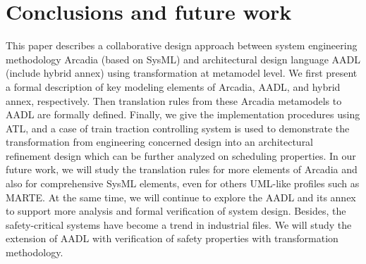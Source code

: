 \section{Conclusions and future work}
This paper describes a collaborative design approach between system engineering methodology Arcadia (based on SysML) and architectural design language AADL (include hybrid annex) using transformation at metamodel level. We first present a formal description of key modeling elements of Arcadia, AADL, and hybrid annex, respectively. Then translation rules from these Arcadia metamodels to AADL are formally defined. Finally, we give the implementation procedures using ATL, and a case of train traction controlling system is used to demonstrate the transformation from engineering concerned design into an architectural refinement design which can be further analyzed on scheduling properties. 
In our future work, we will study the translation rules for more elements of Arcadia and also for comprehensive SysML elements, even for others UML-like profiles such as MARTE. At the same time, we will continue to explore the AADL and its annex to support more analysis and formal verification of system design. Besides, the safety-critical systems have become a trend in industrial files. We will study the extension of AADL with verification of safety properties with transformation methodology. 